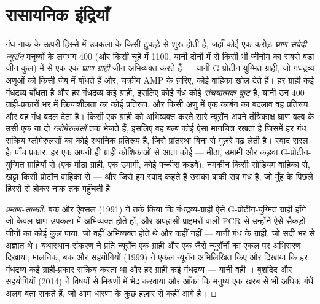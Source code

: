 \section{रासायनिक इंद्रियाँ}

\begin{definition}[घ्राण और स्वाद]\label{def:b3:sensory-systems:chemical}
गंध नाक के ऊपरी हिस्से में उपकला के किसी टुकड़े से शुरू होती है, जहाँ
कोई एक करोड़ \emph{घ्राण संवेदी न्यूरॉन} मनुष्यों के लगभग $400$
(और किसी चूहे में \num{1100}, यानी दोनों में से किसी भी जीनोम का सबसे
बड़ा जीन-कुल) में से एक-एक \emph{घ्राण ग्राही} जीन अभिव्यक्त करते हैं
--- यानी G-प्रोटीन-युग्मित ग्राही, जो गंधद्रव्य अणुओं को किसी जेब में
बाँधते हैं और, चक्रीय AMP के ज़रिए, कोई वाहिका खोल देते हैं। हर ग्राही
कई गंधद्रव्य बाँधता है और हर गंधद्रव्य कई ग्राही, इसलिए कोई गंध कोई
\emph{संचयात्मक कूट} है, यानी उन $400$
ग्राही-प्रकारों भर में क्रियाशीलता का कोई प्रतिरूप, और किसी अणु में एक
कार्बन का बदलाव वह प्रतिरूप और वह गंध बदल देता है। किसी एक ग्राही को
अभिव्यक्त करते सारे न्यूरॉन अपने तंत्रिकाक्ष घ्राण बल्ब के उसी एक या
दो \emph{ग्लोमेरुलसों} तक भेजते हैं, इसलिए वह बल्ब कोई ऐसा मानचित्र
रखता है जिसमें हर गंध सक्रिय ग्लोमेरुलसों का कोई स्थानिक प्रतिरूप है,
जिसे प्रांतस्था बिना  से गुज़रे पढ़ लेती है। स्वाद सरल है: पाँच
प्रकार, हर एक अपनी ही ग्राही कोशिकाओं से आता कोई  ---
मीठा, उमामी और कड़वा G-प्रोटीन-युग्मित ग्राहियों से (एक मीठा ग्राही,
एक उमामी, कोई पच्चीस कड़वे), नमकीन किसी सोडियम वाहिका से, खट्टा किसी
प्रोटॉन वाहिका से --- और जिसे हम स्वाद कहते हैं उसका बाकी सब गंध है,
जो मुँह के पिछले हिस्से से होकर नाक तक पहुँचती है।
\end{definition}

\begin{proof}[प्रमाण-सामग्री]
बक और ऐक्सल (1991) ने तर्क किया कि गंधद्रव्य-ग्राही ऐसे
G-प्रोटीन-युग्मित ग्राही होंगे जो केवल घ्राण उपकला में अभिव्यक्त होते
हों, और अपह्रासी प्राइमरों वाली PCR से उन्होंने ऐसे सैकड़ों जीनों का
कोई कुल पाया, जो वहीं अभिव्यक्त होते थे और कहीं नहीं --- यानी गंध के
ग्राही, जो सदी भर से अज्ञात थे। यथास्थान संकरण ने प्रति न्यूरॉन एक
ग्राही और एक जैसे न्यूरॉनों का एकल  पर अभिसरण दिखाया;
मालनिक, बक और सहयोगियों (1999) ने एकल न्यूरॉन अभिलिखित किए और दिखाया
कि हर गंधद्रव्य कई ग्राही-प्रकार सक्रिय करता था और हर ग्राही कई
गंधद्रव्य --- यानी वही । बुशदिद और सहयोगियों (2014) ने
विषयों से मिश्रणों में भेद करवाया और आँका कि मनुष्य एक खरब से भी अधिक
गंधें अलग बता सकते हैं, जो आम धारणा के कुछ हज़ार से कहीं आगे है।
\end{proof}

